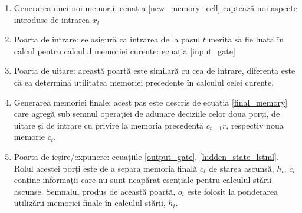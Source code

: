 \begin{enumerate}
	\item Generarea unei noi memorii: ecuația \ref{new_memory_cell} captează noi aspecte introduse de intrarea $x_t$
	\item Poarta de intrare: se asigură că intrarea de la pasul $t$ merită să fie luată în calcul pentru calculul memoriei curente: ecuația \ref{input_gate}
	\item Poarta de uitare: această poartă este similară cu cea de intrare, diferența este că ea determină utilitatea memoriei precedente în calculul celei curente.
	\item Generarea memoriei finale: acest pas este descris de ecuația \ref{final_memory} care agregă sub semnul operației de adunare deciziile celor doua porți, de uitare și de intrare cu privire la memoria precedentă $c_{t-1}r$, respectiv noua memorie $\widetilde{c_t}$.
	\item Poarta de ieșire/expunere: ecuațiile \ref{output_gate}, \ref{hidden_state_lstml}. Rolul acestei porți este de a separa memoria finală $c_{t}$ de starea ascunsă, $h_{t}$. $c_{t}$ conține informații care nu sunt neapărat esențiale pentru calculul stării ascunse. Semnalul produs de această poartă, $o_t$ este folosit la ponderarea utilizării memoriei finale în calculul stării, $h_t$.
\end{enumerate}































